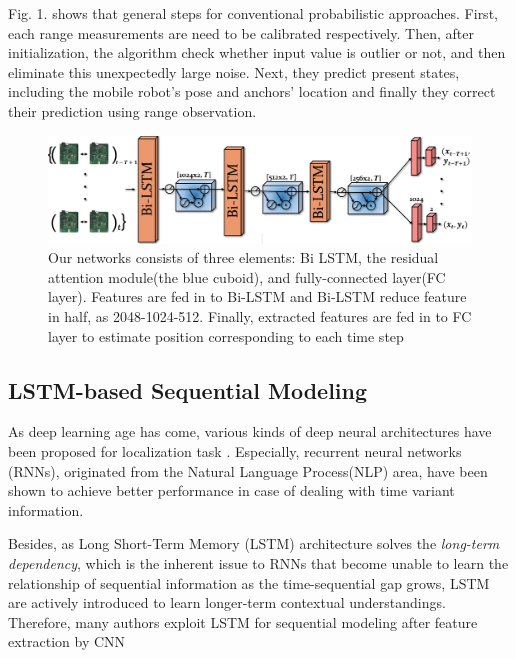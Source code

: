 \documentclass[letterpaper, 10 pt, conference]{ieeeconf}  %
\begin{document}
Fig. 1. shows that general steps for conventional probabilistic approaches. First, each range measurements are need to be calibrated respectively. Then, after initialization, the algorithm check whether input value is outlier or not, and then eliminate this unexpectedly large noise. Next, they predict present states, including the mobile robot's pose and anchors' location and finally they correct their prediction using range observation.

 \begin{figure}[h]
	\centering
	\includegraphics[width=0.95\linewidth]{image/network_figure}
	\caption{Our networks consists of three elements: Bi LSTM, the residual attention module(the blue cuboid), and fully-connected layer(FC layer). Features are fed in to Bi-LSTM and Bi-LSTM reduce feature in half, as 2048-1024-512. Finally, extracted features are fed in to FC layer to estimate position corresponding to each time step}
	\label{fig:our_network} 	
\end{figure}

\subsection{LSTM-based Sequential Modeling}

As deep learning age has come\cite{lecun2015deep}, various kinds of deep neural architectures have been proposed for localization task \cite{kendall2016modelling, kendall2015posenet, gladh2016deep}. Especially, recurrent neural networks (RNNs), originated from the Natural Language Process(NLP) area\cite{elman1990finding}, have been shown to achieve better performance in case of dealing with time variant information. 

Besides, as Long Short-Term Memory (LSTM) architecture solves the \textit{long-term dependency}, which is the inherent issue to RNNs that become unable to learn the relationship of sequential information as the time-sequential gap grows\cite{hochreiter1997long}, LSTM are actively introduced to learn longer-term contextual understandings. Therefore, many authors exploit LSTM for sequential modeling after feature extraction by CNN\cite{clark2017vinet,patel2018contextualnet, wang2017deepvo}
 
\end{document}
